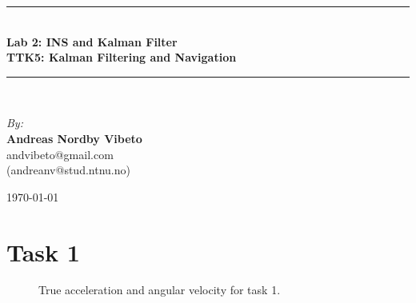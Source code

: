 \documentclass{article}
\newcommand{\HRule}{\rule{\linewidth}{0.5mm}}
\begin{document}

\begin{center}

\HRule \\[0.4cm]
{ \huge \bfseries Lab 2: INS and Kalman Filter \\[0.4cm] 
\Large \bfseries TTK5: Kalman Filtering and Navigation \\[0.4cm] } 

\HRule \\[1.5cm]

\begin{center} \large
\emph{By:}\\
\textbf{Andreas Nordby Vibeto}\\
andvibeto@gmail.com \\
(andreanv@stud.ntnu.no)
\end{center}

\vfill

{\large \monthyear\today}

\end{center}
\newpage
{}

\section*{Task 1}
\begin{figure}[!ht]
    \centering
    \caption{True acceleration and angular velocity for task 1.}
\end{figure}
\end{document}
